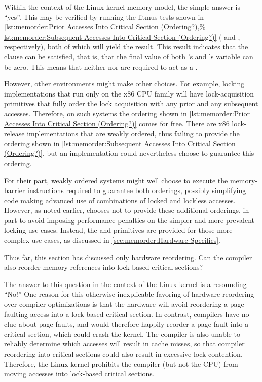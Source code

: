 Within the context of the Linux-kernel memory model, the simple answer
is ``yes''.
This may be verified by running the litmus tests shown in
\cref{lst:memorder:Prior Accesses Into Critical Section (Ordering?),%
lst:memorder:Subsequent Accesses Into Critical Section (Ordering?)}
( and ,
respectively), both of which will yield the  result.
This result indicates that the  clause can be satisfied, that
is, that the final value of both 's and 's  variable
can be zero.
This means that neither  nor 
are required to act as a .

However, other environments might make other choices.
For example, locking implementations that run only on the x86 CPU
family will have lock-acquisition primitives that fully order the lock
acquisition with any prior and any subsequent accesses.
Therefore, on such systems the ordering shown in
\cref{lst:memorder:Prior Accesses Into Critical Section (Ordering?)}
comes for free.
There are x86 lock-release implementations that are weakly ordered,
thus failing to provide the ordering shown in
\cref{lst:memorder:Subsequent Accesses Into Critical Section (Ordering?)},
but an implementation could nevertheless choose to guarantee this ordering.

For their part, weakly ordered systems might well choose to execute
the memory-barrier instructions required to guarantee both orderings,
possibly simplifying code making advanced use of combinations of locked
and lockless accesses.
However, as noted earlier,  chooses not to provide these additional
orderings, in part to avoid imposing performance penalties on the simpler
and more prevalent locking use cases.
Instead, the  and 
primitives are provided for those more complex use cases, as discussed
in \cref{sec:memorder:Hardware Specifics}.

Thus far, this section has discussed only hardware reordering.
Can the compiler also reorder memory references into lock-based
critical sections?

The answer to this question in the context of the Linux kernel is a
resounding ``No!''
One reason for this otherwise inexplicable favoring of hardware reordering
over compiler optimizations is that the hardware will avoid reordering
a page-faulting access into a lock-based critical section.
In contrast, compilers have no clue about page faults, and would
therefore happily reorder a page fault into a critical section, which
could crash the kernel.
The compiler is also unable to reliably determine which accesses
will result in cache misses, so that compiler reordering into critical
sections could also result in excessive lock contention.
Therefore, the Linux kernel prohibits the compiler (but not the CPU)
from moving accesses into lock-based critical sections.

